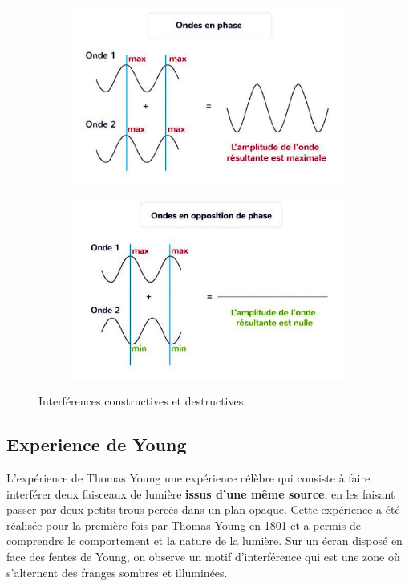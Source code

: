 \documentclass[11pt,a4paper]{article}
\begin{document}
\begin{figure}[ht]
\centering
\begin{subfigure}{.47\textwidth}
  \centering
  \includegraphics[width=.95\linewidth]{imgs/p5/enPhase.jpg}  
\end{subfigure}
\begin{subfigure}{.47\textwidth}
  \centering
  \includegraphics[width=.95\linewidth]{imgs/p5/oppoPhase.jpg}  
\end{subfigure}
\caption{Interférences constructives et destructives}
\end{figure}

\subsection{Experience de Young}

L'expérience de Thomas Young  une expérience célèbre qui consiste à faire interférer deux faisceaux de lumière \textbf{issus d'une même source}, en les faisant passer par deux petits trous percés dans un plan opaque. Cette expérience a été réalisée pour la première fois par Thomas Young en 1801 et a permis de comprendre le comportement et la nature de la lumière. Sur un écran disposé en face des fentes de Young, on observe un motif d’interférence  qui est une zone où s'alternent des franges sombres et illuminées.
\end{document}
